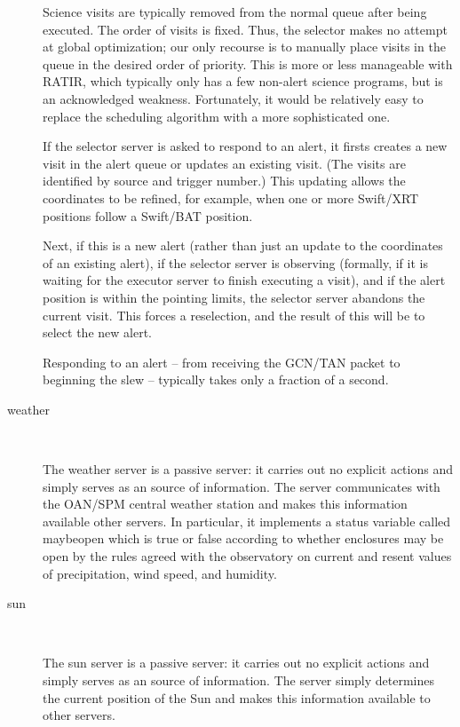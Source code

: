 \documentclass{article}
\newcommand{\server}[1]{{\ttfamily #1}}
\newcommand{\variable}[1]{{\ttfamily #1}}
\begin{document}
\begin{description}
Science visits are typically removed from the normal queue after being executed. The order of visits is fixed. Thus, the selector makes no attempt at global optimization; our only recourse is to manually place visits in the queue in the desired order of priority. This is more or less manageable with RATIR, which typically only has a few non-alert science programs, but is an acknowledged weakness. Fortunately, it would be relatively easy to replace the scheduling algorithm with a more sophisticated one.

If the \server{selector} server is asked to respond to an alert, it firsts creates a new visit in the alert queue or updates an existing visit. (The visits are identified by source and trigger number.) This updating allows the coordinates to be refined, for example, when one or more Swift/XRT positions follow a Swift/BAT position.

Next, if this is a new alert (rather than just an update to the coordinates of an existing alert), if the \server{selector} server is observing (formally, if it is waiting for the \server{executor} server to finish executing a visit), and if the alert position is within the pointing limits, the \server{selector} server abandons the current visit. This forces a reselection, and the result of this will be to select the new alert.

Responding to an alert -- from receiving the GCN/TAN packet to beginning the slew -- typically takes only a fraction of a second.

\item[\server{weather}]~

The \server{weather} server is a passive server: it carries out no explicit actions and simply serves as an source of information.
The server communicates with the OAN/SPM central weather station and makes this information available other servers. In particular, it implements a status variable called \variable{maybeopen} which is true or false according to whether enclosures may be open by the rules agreed with the observatory on current and resent values of precipitation, wind speed, and humidity.

\item[\server{sun}]~

The \server{sun} server is a passive server: it carries out no explicit actions and simply serves as an source of information. The server simply determines the current position of the Sun and makes this information available to other servers.


\end{description}
\end{document}
